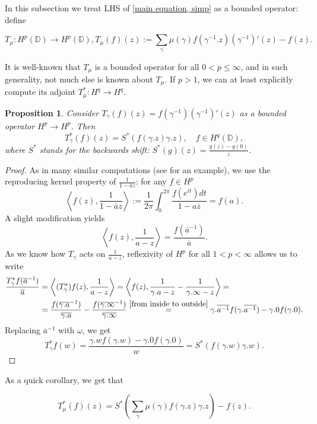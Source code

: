 \documentclass[11pt]{article}
\newtheorem{proposition}{Proposition}[section]
\begin{document}
In this subsection we treat LHS of \eqref{main equation, simp} as a bounded operator: define

\[
T_\mu: H^p(\mathbb{D}) \rightarrow H^p(\mathbb{D}), T_\mu(f)(z) := \sum_{\gamma} \mu(\gamma) f(\gamma^{-1}.z)(\gamma^{-1})'(z) - f(z).
\]

It is well-known that $T_\mu$ is a bounded operator for all $0 < p \le \infty$, and in such generality, not much else is known about $T_\mu$. If $p > 1$, we can at least explicitly compute its adjoint $T^*_\mu : H^q \rightarrow H^q$.

\begin{proposition}
	Consider $T_\gamma(f)(z) = f(\gamma^{-1})(\gamma^{-1})'(z)$ as a bounded operator $H^p \rightarrow H^p$. Then
	\[
	T^*_\gamma(f)(z) = S^*(f(\gamma.z) \gamma.z), \quad f \in H^q(\mathbb{D}),
	\]
	where $S^*$ stands for the backwards shift: $S^*(g)(z) = \frac{g(z) - g(0)}{z}$.
\end{proposition}
\begin{proof}
	As in many similar computations (see \cite[Theorem 2]{cowen1988linear} for an example), we use the reproducing kernel property of $\frac{1}{1 - \overline{a}z}$: for any $f \in H^p$
	\[
	\left\langle f(z), \frac{1}{1 - \overline{a}z} \right\rangle := \frac{1}{2\pi} \int_{0}^{2 \pi} \frac{f(e^{it}) dt}{1 - a \overline{z}} = f(a).
 	\]
 	A slight modification yields
 	\[
 	\left\langle f(z), \frac{1}{a - z} \right\rangle = \frac{f(\overline{a}^{-1})}{\overline{a}}.
 	\]
 	As we know how $T_\gamma$ acts on $\frac{1}{a - z}$, reflexivity of $H^p$ for all $1 < p < \infty$ allows us to write
 	\[
 	\begin{aligned}
 		\frac{T^*_\gamma f(\overline{a}^{-1})}{\overline{a}} &= \left\langle (T_\gamma^*)f(z), \frac{1}{a - z} \right\rangle =  \left\langle f(z), \frac{1}{\gamma.a - z} - \frac{1}{\gamma.\infty - z} \right\rangle = \\ 
 		&=\frac{f(\overline{\gamma.a}^{-1})}{\overline{\gamma.a}} - \frac{f(\overline{\gamma.\infty}^{-1})}{\overline{\gamma.\infty}} \stackrel{\eqref{from inside to outside}}{=} \gamma.\overline{a^{-1}} f(\gamma.\overline{a^{-1}}) - \gamma.0 f(\gamma.0).
 	\end{aligned}
 	\]
 	Replacing $\overline{a}^{-1}$ with $\omega$, we get
 	\[
 	T^*_\gamma f(w) = \frac{\gamma.w f(\gamma.w) - \gamma.0 f(\gamma.0)}{w} = S^*(f(\gamma.w) \gamma.w).
 	\]
\end{proof}

As a quick corollary, we get that

\begin{equation}
	\label{adjoint of LHS}
	T_\mu^*(f)(z) = S^*\left( \sum_{\gamma} \mu(\gamma) f(\gamma.z) \gamma.z\right)  - f(z).
\end{equation}
\end{document}
